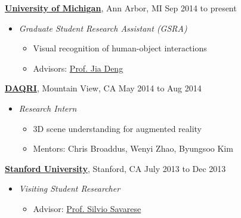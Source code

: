 \documentclass[10pt]{article}
\newenvironment{innerlist}[1][\enskip\textbullet]%
        {\begin{itemize}[#1,leftmargin=*,parsep=0pt,itemsep=0pt,topsep=0pt,partopsep=0pt]}
        {\end{itemize}}
\begin{document}
\href{http://www.umich.edu}{\textbf{University of Michigan}}, Ann Arbor, MI \hfill {Sep 2014 to present} \\
\vspace{-.15in}
\begin{innerlist}
\item[] \emph{Graduate Student Research Assistant (GSRA)} \\
    \vspace{-.15in}
    \begin{innerlist}
    \item Visual recognition of human-object interactions
    \item Advisors: \href{http://http://web.eecs.umich.edu/~jiadeng/}{Prof. Jia Deng}
    \end{innerlist}
\end{innerlist}
\vspace{.1in}
\href{http://daqri.com/}{\textbf{DAQRI}}, Mountain View, CA \hfill {May 2014 to Aug 2014} \\
\vspace{-.15in}
\begin{innerlist}
\item[] \emph{Research Intern} \\
    \vspace{-.15in}
    \begin{innerlist}
    \item 3D scene understanding for augmented reality
    \item Mentors: Chris Broaddus, Wenyi Zhao, Byungsoo Kim
    \end{innerlist}
\end{innerlist}
\vspace{.1in}
\href{http://www.stanford.edu}{\textbf{Stanford University}}, Stanford, CA \hfill {July 2013 to Dec 2013} \\
\vspace{-.15in}
\begin{innerlist}
\item[] \emph{Visiting Student Researcher} \\
    \vspace{-.15in}
    \begin{innerlist}
    \item Advisor: \href{http://cvgl.stanford.edu/silvio/}{Prof. Silvio Savarese}
    \end{innerlist}
\end{innerlist}
\end{document}
